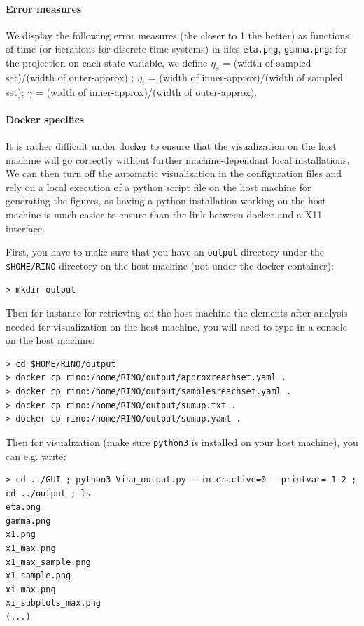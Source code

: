 \documentclass{article}
\begin{document}
\paragraph{Error measures}
We display the following error measures (the closer to 1 the better) as functions of time (or iterations for discrete-time systems) in files \texttt{eta.png},  \texttt{gamma.png}: for the projection on each state variable, we define $\eta_o$ = (width of sampled set)/(width of outer-approx) ; $\eta_i$ = (width of inner-approx)/(width of sampled set);
$\gamma$ = (width of inner-approx)/(width of outer-approx).

\paragraph{Docker specifics}

It is rather difficult under docker to ensure that the visualization on the host
machine will go correctly without further machine-dependant local installations.
We can then turn off the automatic visualization in the configuration files 
and rely on a local execution of a python script file on the
host machine for generating the figures, as having a python installation working
on the host machine is much easier to ensure than the link between docker and
a X11 interface.

First, you have to make sure that you have an \texttt{output} directory under the \texttt{\$HOME/RINO} directory on the host machine (not under the docker container): 
\begin{verbatim}
> mkdir output
\end{verbatim}

Then for instance for retrieving on the host machine the elements after analysis needed for visualization on the host machine, you will need to type in a console on the host machine:

\begin{verbatim}
> cd $HOME/RINO/output
> docker cp rino:/home/RINO/output/approxreachset.yaml . 
> docker cp rino:/home/RINO/output/samplesreachset.yaml .
> docker cp rino:/home/RINO/output/sumup.txt .
> docker cp rino:/home/RINO/output/sumup.yaml .
\end{verbatim}


Then for visualization (make sure \texttt{python3} is installed on your host machine), you can e.g. write: %
\begin{verbatim}
> cd ../GUI ; python3 Visu_output.py --interactive=0 --printvar=-1-2 ; cd ../output ; ls
eta.png
gamma.png
x1.png
x1_max.png
x1_max_sample.png
x1_sample.png
xi_max.png
xi_subplots_max.png
(...)
\end{verbatim}
\end{document}
